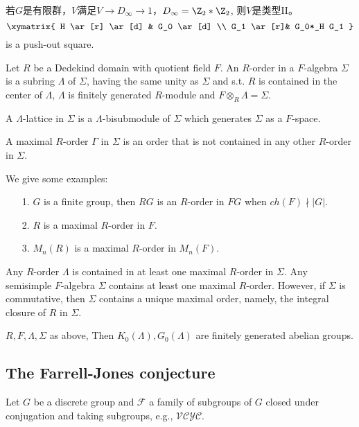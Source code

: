 若$G$是有限群，$V$满足$ V\to D_{\infty}\to 1$，$D_{\infty}=\Z_2*\Z_2$, 则$V$是类型II。
\[
\xymatrix{
  H \ar[r] \ar[d] & G_0 \ar[d]  \\
  G_1 \ar[r]& G_0*_H G_1  }
\]
is a push-out square.
\begin{definition}[Orders]
Let $R$ be a Dedekind domain with quotient field $F$. %
An $R$-order in a $F$-algebra $\Sigma$ is a subring $\Lambda$ of $\Sigma$, having the same unity as $\Sigma$ and s.t. $R$ is contained in the center of $\Lambda$, $\Lambda$ is finitely generated $R$-module and $F\otimes_R \Lambda =\Sigma$.

A $\Lambda$-lattice in $\Sigma$ is a $\Lambda$-bisubmodule of $\Sigma$ which generates $\Sigma$ as a $F$-space.

A maximal $R$-order $\Gamma$ in $\Sigma$ is an order that is not contained in any other $R$-order in $\Sigma$.
\end{definition}
\begin{example}
We give some examples:
\begin{itemize}
    \item[1.] $G$ is a finite group, then $RG$ is an $R$-order in $FG$ when $ch(F) \nmid |G|$.
	\item[2.] $R$ is a maximal $R$-order in $F$.
	\item[3.] $M_n(R)$ is a maximal $R$-order in $M_n(F)$.
\end{itemize}

\end{example}
\begin{remark}
Any $R$-order $\Lambda$ is contained in at least one maximal $R$-order in $\Sigma$. Any semisimple $F$-algebra $\Sigma$ contains at least one maximal $R$-order. However, if $\Sigma$ is commutative, then $\Sigma$ contains a unique maximal order, namely, the integral closure of $R$ in $\Sigma$.
\end{remark}
\begin{theorem}
$R, F, \Lambda, \Sigma$ as above, Then $K_0(\Lambda), G_0(\Lambda)$ are finitely generated abelian groups.
\end{theorem}

\subsection{The Farrell-Jones  conjecture}
Let $G$ be a discrete group and $\mathcal{F}$ a family of subgroups of $G$ closed under
conjugation and taking subgroups, e.g., $\mathcal{VCYC}$.

